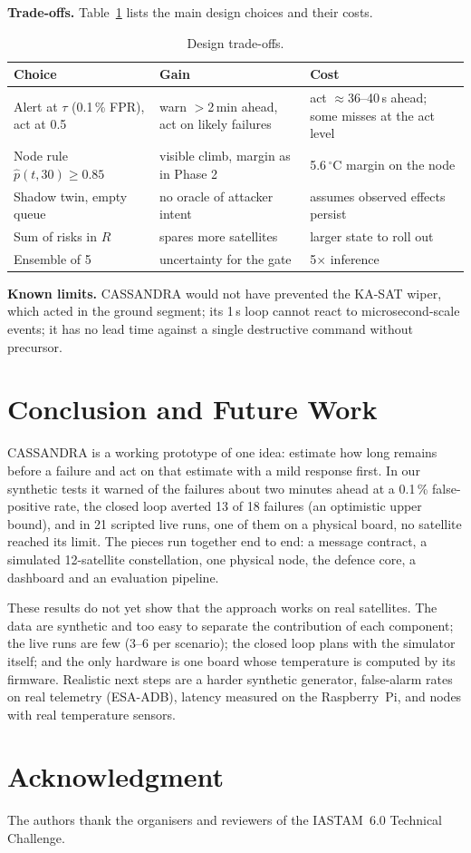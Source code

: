 \documentclass[conference]{IEEEtran}
\newcommand{\degC}{$^{\circ}$C}
\begin{document}
\textbf{Trade-offs.} Table~\ref{tab:tradeoff} lists the main design choices and their costs.

\begin{table}[t]
\caption{Design trade-offs.}
\label{tab:tradeoff}
\centering
\footnotesize
\setlength{\tabcolsep}{3pt}
\begin{tabular}{@{}p{27mm}p{27mm}p{25mm}@{}}
\toprule
Choice & Gain & Cost \\
\midrule
Alert at $\tau$ (0.1\,\% FPR), act at 0.5 & warn $>$2\,min ahead, act on likely failures & act $\approx$36--40\,s ahead; some misses at the act level \\
Node rule $\hat p(t,30)\ge0.85$ & visible climb, margin as in Phase 2 & 5.6\,\degC{} margin on the node \\
Shadow twin, empty queue & no oracle of attacker intent & assumes observed effects persist \\
Sum of risks in $R$ & spares more satellites & larger state to roll out \\
Ensemble of 5 & uncertainty for the gate & 5$\times$ inference \\
\bottomrule
\end{tabular}
\end{table}

\textbf{Known limits.} CASSANDRA would not have prevented the KA-SAT wiper, which acted in the ground
segment; its 1\,s loop cannot react to microsecond-scale events; it has no lead time against a single
destructive command without precursor.

\section{Conclusion and Future Work}
\label{sec:conclusion}

CASSANDRA is a working prototype of one idea: estimate how long remains before a failure and act on that
estimate with a mild response first. In our synthetic tests it warned of the failures about two minutes
ahead at a 0.1\,\% false-positive rate, the closed loop averted 13 of 18 failures (an optimistic upper
bound), and in 21 scripted live runs, one of them on a physical board, no satellite reached its limit.
The pieces run together end to end: a message contract, a simulated 12-satellite constellation, one
physical node, the defence core, a dashboard and an evaluation pipeline.

These results do not yet show that the approach works on real satellites. The data are synthetic and too
easy to separate the contribution of each component; the live runs are few (3--6 per scenario); the
closed loop plans with the simulator itself; and the only hardware is one board whose temperature is
computed by its firmware. Realistic next steps are a harder synthetic generator, false-alarm rates on
real telemetry (ESA-ADB), latency measured on the Raspberry~Pi, and nodes with real temperature
sensors.

\section*{Acknowledgment}
The authors thank the organisers and reviewers of the IASTAM~6.0 Technical Challenge.



\end{document}
